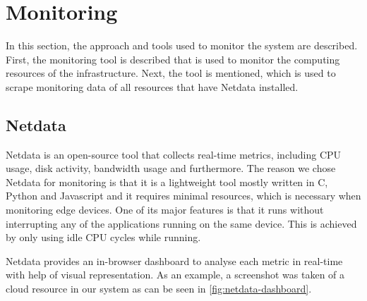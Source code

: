 \documentclass{article}
\begin{document}
                


    \section{Monitoring}
    \label{sec:monitoring}

        In this section, the approach and tools used to monitor the system are described.
        First, the monitoring tool  is described that is used to monitor the computing resources of the infrastructure. Next, the tool  is mentioned, which is used to scrape monitoring data of all resources that have Netdata installed.
            
        \subsection{Netdata}
        \label{sec:netdata-monitoring}

            Netdata \cite{netdataGettingStartedLearn2023} is an open-source tool that collects real-time metrics, including CPU usage, disk activity, bandwidth usage and furthermore.
            The reason we chose Netdata for monitoring is that it is a lightweight tool mostly written in C, Python and Javascript and it requires minimal resources, which is necessary when monitoring edge devices.
            One of its major features is that it runs without interrupting any of the applications running on the same device. This is achieved by only using idle CPU cycles while running.

            Netdata provides an in-browser dashboard to analyse each metric in real-time with help of visual representation. As an example, a screenshot was taken of a cloud resource in our system as can be seen in \ref{fig:netdata-dashboard}.
\end{document}
